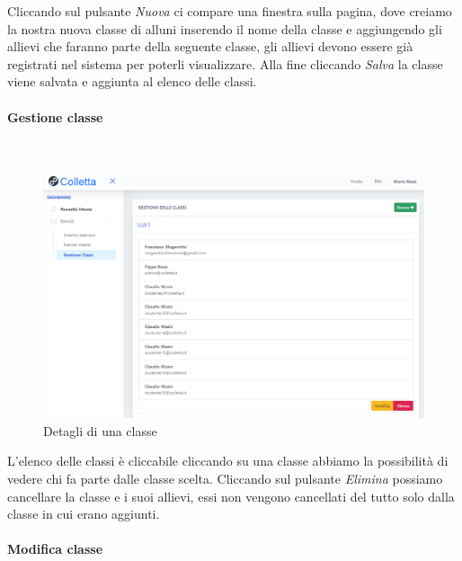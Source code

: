 Cliccando sul pulsante  \textit{Nuova} ci compare una finestra sulla pagina, dove creiamo la nostra nuova classe di alluni inserendo il nome della classe e aggiungendo gli allievi che faranno parte della seguente classe, gli allievi devono essere già registrati nel sistema per poterli visualizzare. Alla fine cliccando \textit{Salva} la classe viene salvata e aggiunta al elenco delle classi.
 
 \paragraph{Gestione classe}\mbox{}\\
 
 \begin{figure}[H]
            	\centering
        		\includegraphics[width=17cm]{sez/img/insegnante/gestioneclasse.PNG} 
            	\caption{Detagli di una classe}\label{fig:1}
        	\end{figure}
        	
        	
 L'elenco delle classi è cliccabile cliccando su una classe abbiamo la possibilità di vedere chi fa parte dalle classe scelta. Cliccando sul pulsante \textit{Elimina} possiamo cancellare la classe e i suoi allievi, essi non vengono cancellati del tutto solo dalla classe in cui erano aggiunti.         
       
       \newpage
         \paragraph{Modifica classe}\mbox{}\\	      
        
